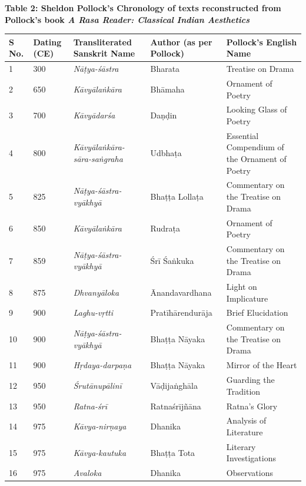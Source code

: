 \textbf{Table 2: Sheldon Pollock’s Chronology of texts reconstructed from Pollock’s book \textit{A Rasa Reader: Classical Indian Aesthetics}}

\begin{longtable}{|l|p{1.1cm}|p{1.98cm}|p{1.98cm}|p{1.98cm}|}
\hline
S No. & Dating (CE) & Transliterated Sanskrit Name & Author (as per Pollock) & Pollock’s English Name \\
\hline
1 & 300 & \textit{Nāṭya-śāstra} & Bharata & Treatise on Drama \\
\hline
2 & 650 & \textit{Kāvyālaṅkāra} & Bhāmaha\index{Bhamaha@Bhāmaha} & Ornament of Poetry \\
\hline
3 & 700 & \textit{Kāvyādarśa} & Daṇḍin\index{Dandin@Daṇḍin} & Looking Glass of Poetry \\
\hline
4 & 800 & \textit{Kāvyālaṅkāra-sāra-saṅgraha} & Udbhaṭa & Essential Compendium of the Ornament of Poetry \\
\hline
5 & 825 & \textit{Nāṭya-śāstra-vyākhyā} & Bhaṭṭa Lollaṭa\index{Bhatta Lollata@Bhaṭṭa Lollaṭa} & Commentary on the Treatise on Drama \\
\hline
6 & 850 & \textit{Kāvyālaṅkāra} & Rudraṭa & Ornament of Poetry \\
\hline
7 & 859 & \textit{Nāṭya-śāstra-vyākhyā} & Śrī Śaṅkuka & Commentary on the Treatise on Drama \\
\hline
8 & 875 & \textit{Dhvanyāloka} & Ānandavar\-dhana\index{Anandavardhana@Ānandavardhana} & Light on Implicature \\
\hline
9 & 900 & \textit{Laghu-vṛtti} & Pratīhārendu\-rāja & Brief Elucidation \\
\hline
10 & 900 & \textit{Nāṭya-śāstra-vyākhyā} & Bhaṭṭa Nāyaka\index{Bhatta Nayaka@Bhaṭṭa Nāyaka} & Commentary on the Treatise on Drama \\
\hline
11 & 900 & \textit{Hṛdaya-darpaṇa} & Bhaṭṭa Nāyaka & Mirror of the Heart \\
\hline
12 & 950 & \textit{Śrutānupālinī} & Vāḍijaṅghāla & Guarding the Tradition \\
\hline
13 & 950 & \textit{Ratna-śrī} & Ratnaśrījñāna & Ratna’s Glory \\
\hline
14 & 975 & \textit{Kāvya-nirṇaya} & Dhanika\index{Dhanika} & Analysis of Literature \\
\hline
15 & 975 & \textit{Kāvya-kautuka} & Bhaṭṭa Tota\index{Bhatta Tota@Bhaṭṭa Tota} & Literary Investigations \\
\hline
16 & 975 & \textit{Avaloka} & Dhanika & Observations \\

\end{longtable}
